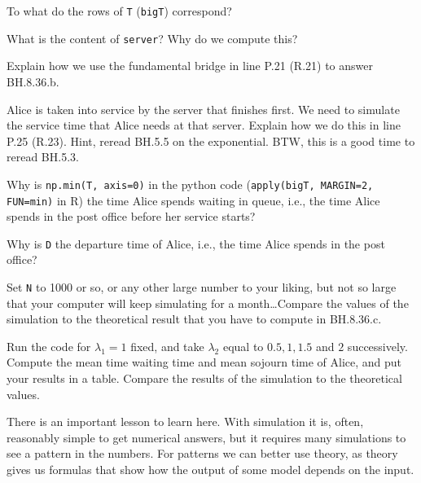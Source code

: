 \begin{exercise}
To what do the rows of \texttt{T} (\texttt{bigT}) correspond?
\end{exercise}

\begin{exercise}
What is the content of \texttt{server}? Why do we compute this?
\end{exercise}

\begin{exercise}
Explain how we use the fundamental bridge in line P.21 (R.21) to answer BH.8.36.b.
\end{exercise}


\begin{exercise}
Alice is taken into service by the server that finishes first.
We need to simulate the service time that Alice needs at that server.
Explain how we do this in line P.25 (R.23). Hint, reread BH.5.5 on the exponential. BTW, this is a good time to reread BH.5.3.
\end{exercise}

\begin{exercise}
Why is \texttt{np.min(T, axis=0)} in the python code (\texttt{apply(bigT, MARGIN=2, FUN=min)} in  R) the time Alice spends waiting in queue, i.e., the time Alice spends in the post office before her service starts?
\end{exercise}


\begin{exercise}
Why is \texttt{D} the departure time of Alice, i.e., the time Alice spends in the post office?
\end{exercise}


\begin{exercise}
Set \texttt{N} to 1000 or so, or any other large number to your liking, but not so large that your computer will keep simulating for a month\ldots Compare the values of the simulation to the theoretical result that you have to compute in BH.8.36.c.
\end{exercise}


\begin{exercise}
Run the code for $\lambda_{1}=1$ fixed, and take $\lambda_{2}$ equal to $0.5, 1, 1.5$ and $2$ successively. Compute the mean time waiting time and mean sojourn time of Alice, and put your results in a table. Compare the results of the simulation to the theoretical values.
\end{exercise}

There is an important lesson to learn here.
With simulation it is, often, reasonably simple to get numerical answers, but it requires many simulations to see a pattern in the numbers.
For patterns we can better use theory, as theory gives us formulas that show how the output of some model depends on the input.
